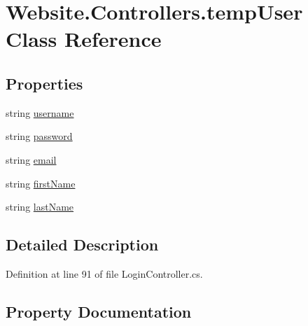 \hypertarget{class_website_1_1_controllers_1_1temp_user}{}\section{Website.\+Controllers.\+temp\+User Class Reference}
\label{class_website_1_1_controllers_1_1temp_user}
\subsection*{Properties}
\begin{DoxyCompactItemize}
\item 
string \hyperlink{class_website_1_1_controllers_1_1temp_user_a19be273f405562c4fe86e8a5effba79a}{username}
\item 
string \hyperlink{class_website_1_1_controllers_1_1temp_user_a04df23ef3edb53782d266efcee34d660}{password}
\item 
string \hyperlink{class_website_1_1_controllers_1_1temp_user_afe48fbce2a792f6d67380c845aafc3b0}{email}
\item 
string \hyperlink{class_website_1_1_controllers_1_1temp_user_aeae4b72c886947233a76374d143ff69d}{first\+Name}
\item 
string \hyperlink{class_website_1_1_controllers_1_1temp_user_a6cece23aea0cf209255c46e5aea62738}{last\+Name}
\end{DoxyCompactItemize}


\subsection{Detailed Description}


Definition at line 91 of file Login\+Controller.\+cs.



\subsection{Property Documentation}
\hypertarget{class_website_1_1_controllers_1_1temp_user_afe48fbce2a792f6d67380c845aafc3b0}{}
